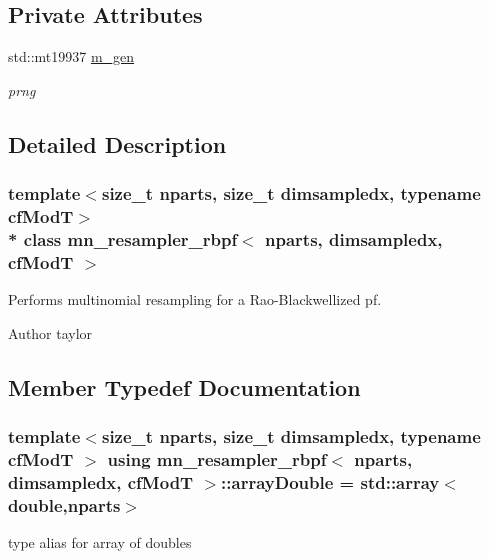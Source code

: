 \subsection*{Private Attributes}
\begin{DoxyCompactItemize}
\item 
std\+::mt19937 \hyperlink{classmn__resampler__rbpf_a64d1dcb87cc76811719de13160421260}{m\+\_\+gen}\hypertarget{classmn__resampler__rbpf_a64d1dcb87cc76811719de13160421260}{}\label{classmn__resampler__rbpf_a64d1dcb87cc76811719de13160421260}

\begin{DoxyCompactList}\small\item\em prng \end{DoxyCompactList}\end{DoxyCompactItemize}


\subsection{Detailed Description}
\subsubsection*{template$<$size\+\_\+t nparts, size\+\_\+t dimsampledx, typename cf\+ModT$>$\\*
class mn\+\_\+resampler\+\_\+rbpf$<$ nparts, dimsampledx, cf\+Mod\+T $>$}

Performs multinomial resampling for a Rao-\/\+Blackwellized pf. 

\begin{DoxyAuthor}{Author}
taylor 
\end{DoxyAuthor}


\subsection{Member Typedef Documentation}
\subsubsection[{\texorpdfstring{array\+Double}{arrayDouble}}]{\setlength{\rightskip}{0pt plus 5cm}template$<$size\+\_\+t nparts, size\+\_\+t dimsampledx, typename cf\+ModT $>$ using {\bf mn\+\_\+resampler\+\_\+rbpf}$<$ nparts, dimsampledx, cf\+ModT $>$\+::{\bf array\+Double} =  std\+::array$<$double,nparts$>$}\hypertarget{classmn__resampler__rbpf_aff8066438dd0932f3ee0602ed1079d3d}{}\label{classmn__resampler__rbpf_aff8066438dd0932f3ee0602ed1079d3d}
type alias for array of doubles 
